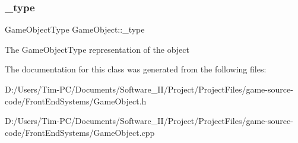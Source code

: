 \subsubsection{\texorpdfstring{\+\_\+type}{\_type}}
{\footnotesize\ttfamily Game\+Object\+Type Game\+Object\+::\+\_\+type\hspace{0.3cm}{\ttfamily [protected]}}

The Game\+Object\+Type representation of the object 

The documentation for this class was generated from the following files\+:\begin{DoxyCompactItemize}
\item 
D\+:/\+Users/\+Tim-\/\+P\+C/\+Documents/\+Software\+\_\+\+I\+I/\+Project/\+Project\+Files/game-\/source-\/code/\+Front\+End\+Systems/Game\+Object.\+h\item 
D\+:/\+Users/\+Tim-\/\+P\+C/\+Documents/\+Software\+\_\+\+I\+I/\+Project/\+Project\+Files/game-\/source-\/code/\+Front\+End\+Systems/Game\+Object.\+cpp\end{DoxyCompactItemize}
